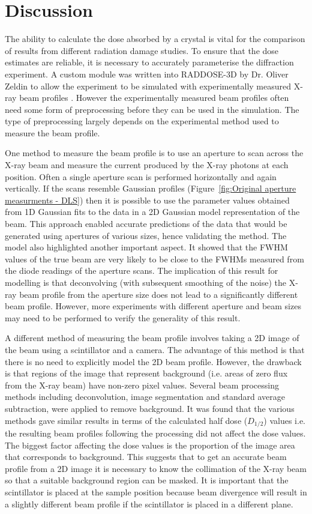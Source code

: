 \section{Discussion}
\label{sec:Discussion - Beam Chapter}
The ability to calculate the dose absorbed by a crystal is vital for the comparison of results from different radiation damage studies.
To ensure that the dose estimates are reliable, it is necessary to accurately parameterise the diffraction experiment.
A custom module was written into RADDOSE-3D by Dr. Oliver Zeldin to allow the experiment to be simulated with experimentally measured X-ray beam profiles \cite{zeldin2013dwd}.
However the experimentally measured beam profiles often need some form of preprocessing before they can be used in the simulation.
The type of preprocessing largely depends on the experimental method used to measure the beam profile.

One method to measure the beam profile is to use an aperture to scan across the X-ray beam and measure the current produced by the X-ray photons at each position.
Often a single aperture scan is performed horizontally and again vertically.
If the scans resemble Gaussian profiles (Figure~\ref{fig:Original aperture measurments - DLS}) then it is possible to use the parameter values obtained from 1D Gaussian fits to the data in a 2D Gaussian model representation of the beam.
This approach enabled accurate predictions of the data that would be generated using apertures of various sizes, hence validating the method.
The model also highlighted another important aspect.
It showed that the FWHM values of the true beam are very likely to be close to the FWHMs measured from the diode readings of the aperture scans.
The implication of this result for modelling is that deconvolving (with subsequent smoothing of the noise) the X-ray beam profile from the aperture size does not lead to a significantly different beam profile.
However, more experiments with different aperture and beam sizes may need to be performed to verify the generality of this result.

A different method of measuring the beam profile involves taking a 2D image of the beam using a scintillator and a camera.
The advantage of this method is that there is no need to explicitly model the 2D beam profile.
However, the drawback is that regions of the image that represent background (i.e. areas of zero flux from the X-ray beam) have non-zero pixel values.
Several beam processing methods including deconvolution, image segmentation and standard average subtraction, were applied to remove background.
It was found that the various methods gave similar results in terms of the calculated half dose ($D_{1/2}$) values i.e. the resulting beam profiles following the processing did not affect the dose values.
The biggest factor affecting the dose values is the proportion of the image area that corresponds to background.
This suggests that to get an accurate beam profile from a 2D image it is necessary to know the collimation of the X-ray beam so that a suitable background region can be masked.
It is important that the scintillator is placed at the sample position because beam divergence will result in a slightly different beam profile if the scintillator is placed in a different plane.

